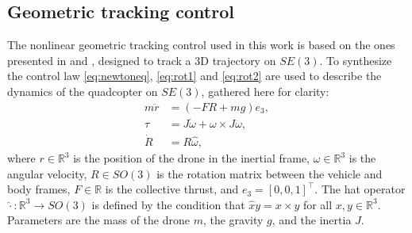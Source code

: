 \subsection{Geometric tracking control}
The nonlinear geometric tracking control used in this work is based on the ones presented in \cite{lelemc2010} and \cite{turpinkumar2011}, designed to track a 3D trajectory on $SE(3)$. To synthesize the control law \eqref{eq:newtoneq}, \eqref{eq:rot1} and \eqref{eq:rot2} are used to describe the dynamics of the quadcopter on $SE(3)$, gathered here for clarity:
\begin{subequations}
\begin{align}
    m\ddot{r}& = (-FR + mg)e_3,\label{eq:geom_tran}\\
    \tau& = J\dot\omega + \omega\times J \omega,\\
    \dot R &= R\hat{\omega},
\end{align}
\end{subequations}
where $r\in\mathbb{R}^3$ is the position of the drone in the inertial frame, $\omega\in\mathbb{R}^3$ is the angular velocity, $R\in SO(3)$ is the rotation matrix between the vehicle and body frames, $F\in\mathbb{R}$ is the collective thrust, and $e_3=[ 0, 0, 1 ]^\top$. The hat operator $\hat{\cdot}:\mathbb{R}^3\rightarrow SO(3)$ is defined by the condition that $\hat{x}y = x\times y$ for all $x,y\in \mathbb{R}^3$. Parameters are the mass of the drone $m$, the gravity $g$, and the inertia $J$.

